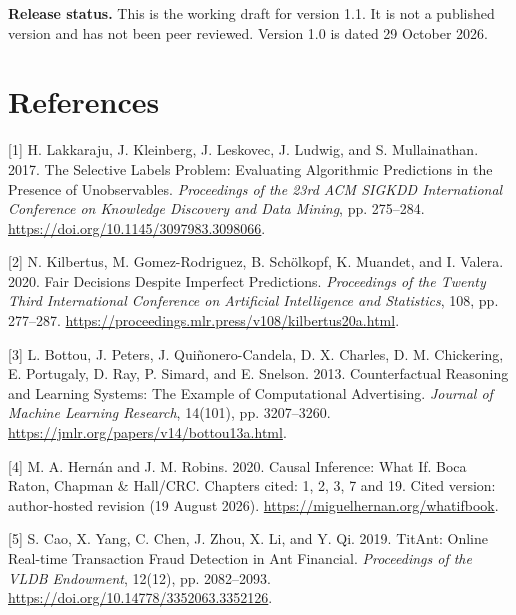 \documentclass[acmlarge,nonacm]{acmart}
\newlength{\cslhangindent}
\newlength{\cslentryspacingunit} %
\newenvironment{CSLReferences}[2] %
 {\bibliofont %
  \setlength{\parindent}{0pt}
  \ifodd #1
  \let\oldpar\par
  \def\par{\hangindent=\cslhangindent\oldpar}
  \fi
  \setlength{\parskip}{#2\cslentryspacingunit}
 }%
 {}
\begin{document}
\textbf{Release status.} This is the working draft for version 1.1. It
is not a published version and has not been peer reviewed. Version 1.0
is dated 29 October 2026.

\hypertarget{references}{%
\section*{References}\label{references}}

\hypertarget{refs}{}
\begin{CSLReferences}{1}{1}
\leavevmode{}%
{[}1{]} H. Lakkaraju, J. Kleinberg, J. Leskovec, J. Ludwig, and S.
Mullainathan. 2017. The Selective Labels Problem: Evaluating Algorithmic
Predictions in the Presence of Unobservables. \emph{Proceedings of the
23rd ACM SIGKDD International Conference on Knowledge Discovery and Data
Mining}, pp. 275--284. \url{https://doi.org/10.1145/3097983.3098066}.

\leavevmode{}%
{[}2{]} N. Kilbertus, M. Gomez-Rodriguez, B. Schölkopf, K. Muandet, and
I. Valera. 2020. Fair Decisions Despite Imperfect Predictions.
\emph{Proceedings of the Twenty Third International Conference on
Artificial Intelligence and Statistics}, 108, pp. 277--287.
\url{https://proceedings.mlr.press/v108/kilbertus20a.html}.

\leavevmode{}%
{[}3{]} L. Bottou, J. Peters, J. Quiñonero-Candela, D. X. Charles, D. M.
Chickering, E. Portugaly, D. Ray, P. Simard, and E. Snelson. 2013.
Counterfactual Reasoning and Learning Systems: The Example of
Computational Advertising. \emph{Journal of Machine Learning Research},
14(101), pp. 3207--3260.
\url{https://jmlr.org/papers/v14/bottou13a.html}.

\leavevmode{}%
{[}4{]} M. A. Hernán and J. M. Robins. 2020. Causal Inference: What If.
Boca Raton, Chapman \& Hall/CRC. Chapters cited: 1, 2, 3, 7 and 19.
Cited version: author-hosted revision (19 August 2026).
\url{https://miguelhernan.org/whatifbook}.

\leavevmode{}%
{[}5{]} S. Cao, X. Yang, C. Chen, J. Zhou, X. Li, and Y. Qi. 2019.
TitAnt: Online Real-time Transaction Fraud Detection in Ant Financial.
\emph{Proceedings of the VLDB Endowment}, 12(12), pp. 2082--2093.
\url{https://doi.org/10.14778/3352063.3352126}.


\end{CSLReferences}
\end{document}
